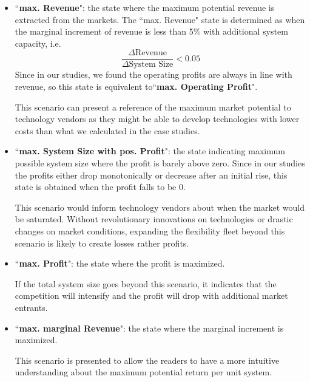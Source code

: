 \begin{itemize}
	\item ``\textbf{max. Revenue}": the state where the maximum potential revenue is extracted from the markets. The ``max. Revenue" state is determined as when the marginal increment of revenue is less than 5\% with additional system capacity, i.e. 
	\begin{equation*}
	\frac{\Delta\text{Revenue}}{\Delta\text{System Size}} < 0.05
	\end{equation*}
	Since in our studies, we found the operating profits are always in line with revenue, so this state is equivalent to``\textbf{max. Operating Profit}".
	
	This scenario can present a reference of the maximum market potential to technology vendors as they might be able to develop technologies with lower costs than what we calculated in the case studies. 
	\item ``\textbf{max. System Size with pos. Profit}": the state indicating maximum possible system size where the profit is barely above zero. Since in our studies the profits either drop monotonically or decrease after an initial rise, this state is obtained when the profit falls to be 0.
	
	This scenario would inform technology vendors about when the market would be saturated. Without revolutionary innovations on technologies or drastic changes on market conditions, expanding the flexibility fleet beyond this scenario is likely to create losses rather profits. 
	
	\item ``\textbf{max. Profit}": the state where the profit is maximized.
	
	If the total system size goes beyond this scenario, it indicates that the competition will intensify and the profit will drop with additional market entrants.
   
	\item ``\textbf{max. marginal Revenue}": the state where the marginal increment is maximized. 
	
	This scenario is presented to allow the readers to have a more intuitive understanding about the maximum potential return per unit system.
	
\end{itemize}

